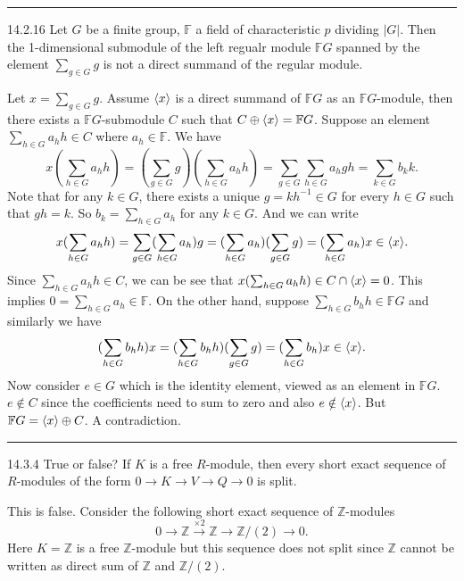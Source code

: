 \documentclass[a4paper, 12pt]{article}
\begin{document}
\noindent\rule{7in}{2.8pt}
\begin{problem}{14.2.16}
Let \(G\) be a finite group, \(\mathbb{F}\) a field of characteristic \(p\) dividing \(|G|\). Then the 1-dimensional submodule of the left regualr module \(\mathbb{F}G\) spanned by 
the element \(\sum_{g\in G}g\) is not a direct summand of the regular module.
\end{problem}
\begin{solution}
Let \(x=\sum_{g\in G}g\). Assume \(\langle x\rangle \) is a direct summand of \(\mathbb{F}G\) as an \(\mathbb{F}G\)-module, then there exists a \(\mathbb{F}G\)-submodule \(C\) such that \(C\oplus \langle x\rangle=\mathbb{F}G\). Suppose an element \(\sum_{h\in G}a_h h\in C\) where \(a_h\in \mathbb{F}\). We have 
\[x(\sum_{h\in G}a_h h)=(\sum_{g\in G}g)(\sum_{h\in G}a_h h)=\sum_{g\in G}\sum_{h\in G}a_h gh=\sum_{k\in G}b_k k.\]
Note that for any \(k\in G\), there exists a unique \(g=kh^{-1}\in G\) for every \(h\in G\) such that \(gh=k\). So \(b_k=\sum_{h\in G}a_h\) for any \(k\in G\). And we can write  
\[x(\sum_{h\in G}a_h h)=\sum_{g\in G}(\sum_{h\in G}a_h)g=(\sum_{h\in G}a_h)(\sum_{g\in G}g)=(\sum_{h\in G}a_h)x\in \langle x\rangle.\]
Since \(\sum_{h\in G}a_h h\in C\), we can be see that \(x(\sum_{h\in G}a_h h)\in C\cap \langle x\rangle=0\). This implies \(0=\sum_{h\in G}a_h\in \mathbb{F}\). 
On the other hand, suppose \(\sum_{h\in G}b_h h\in \mathbb{F}G\) and similarly we have 
\[(\sum_{h\in G}b_h h)x=(\sum_{h\in G}b_h h)(\sum_{g\in G} g)=(\sum_{h\in G}b_h)x\in \langle x\rangle.\]
Now consider \(e\in G\) which is the identity element, viewed as an element in \(\mathbb{F}G\). \(e\notin C\) since the coefficients need to sum to zero and also \(e\notin \langle x \rangle\). But \(\mathbb{F}G=\langle x\rangle \oplus C\). A contradiction.
\end{solution}

\noindent\rule{7in}{2.8pt}
\begin{problem}{14.3.4}
True or false? If \(K\) is a free \(R\)-module, then every short exact sequence of \(R\)-modules of the form \(0\rightarrow K\rightarrow V\rightarrow Q\rightarrow 0\) is split.
\end{problem}
\begin{solution}
This is false. Consider the following short exact sequence of \(\mathbb{Z}\)-modules 
\[0\rightarrow \mathbb{Z}\xrightarrow{\times 2}\mathbb{Z}\rightarrow \mathbb{Z}/(2)\rightarrow 0.\]
Here \(K=\mathbb{Z}\) is a free \(\mathbb{Z}\)-module but this sequence does not split since \(\mathbb{Z}\) cannot be written as direct sum of \(\mathbb{Z}\) and \(\mathbb{Z}/(2)\).
\end{solution}
\end{document}
